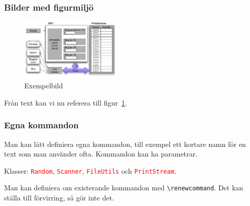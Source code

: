 \begin{frame}[fragile,t]
  \frametitle{Bilder med figurmiljö}
  \vspace{1em}


    \begin{exlatex}
\begin{figure}
  \centering
  \includegraphics[height=30mm]
      {images/enkelmodell.pdf}
  \caption{Exempelbild}
  \label{fig:exempelbild}
\end{figure}
Från text kan vi nu referera till figur~\ref{fig:exempelbild}.
    \end{exlatex}

\end{frame}


\begin{frame}[fragile]
  \frametitle{Egna kommandon}
  Man kan lätt definiera egna kommandon, till exempel ett kortare namn
  för en text som man använder ofta. Kommandon kan ha parametrar.

  \vspace{10mm}

  \begin{exlatex}
\newcommand{\scala}[1]
  {\texttt{\textcolor{red}{#1}}}

Klasser: \scala{Random},
\scala{Scanner}, \scala{FileUtils} och
\scala{PrintStream}.
  \end{exlatex}

  \vspace{10mm}

  Man kan definiera om existerande kommandon med
  \verb+\renewcommand+. Det kan ställa till förvirring, så
  gör inte det.
\end{frame}

